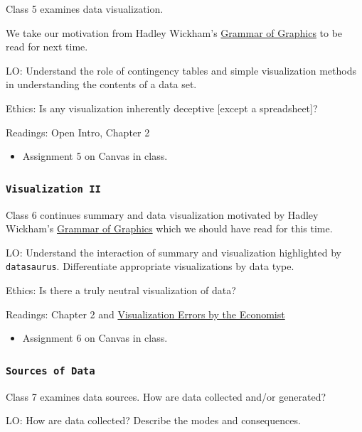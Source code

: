 \documentclass[11pt,]{article}
\begin{document}
Class 5 examines data visualization.

We take our motivation from Hadley Wickham's
\href{https://vita.had.co.nz/papers/layered-grammar.html}{Grammar of
Graphics} to be read for next time.

LO: Understand the role of contingency tables and simple visualization
methods in understanding the contents of a data set.

Ethics: Is any visualization inherently deceptive {[}except a
spreadsheet{]}?

Readings: Open Intro, Chapter 2

\begin{itemize}
\item Assignment 5 on Canvas in class.
\end{itemize}

\subsubsection{\texorpdfstring{\texttt{Visualization\ II}}{Visualization II}}\label{visualization-ii}

Class 6 continues summary and data visualization motivated by Hadley
Wickham's
\href{https://vita.had.co.nz/papers/layered-grammar.html}{Grammar of
Graphics} which we should have read for this time.

LO: Understand the interaction of summary and visualization highlighted
by \texttt{datasaurus}. Differentiate appropriate visualizations by data
type.

Ethics: Is there a truly neutral visualization of data?

Readings: Chapter 2 and
\href{https://medium.economist.com/mistakes-weve-drawn-a-few-8cdd8a42d368}{Visualization
Errors by the Economist}

\begin{itemize}
\item Assignment 6 on Canvas in class.
\end{itemize}

\subsubsection{\texorpdfstring{\texttt{Sources\ of\ Data}}{Sources of Data}}\label{sources-of-data}

Class 7 examines data sources. How are data collected and/or generated?

LO: How are data collected? Describe the modes and consequences.
\end{document}
